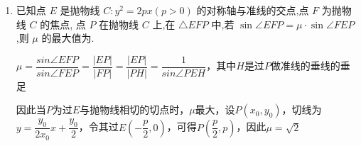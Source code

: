 \begin{enumerate}
\begin{jieda}
        经检验$p = 2, m = 4$满足要求.
    \end{jieda}
    \item 已知点 $E$ 是抛物线 $C : {y}^{2} = {2px}\left( {p > 0}\right)$ 的对称轴与准线的交点,点 $F$ 为抛物线 $C$ 的焦点, 点 $P$ 在抛物线 $C$ 上,在 $\bigtriangleup {EFP}$ 中,若 $\sin \angle {EFP} = \mu  \cdot  \sin \angle {FEP}$ ,则 $\mu$ 的最大值为.
    \begin{jieda}
        $\mu = \dfrac{sin\angle{EFP}}{sin\angle{FEP}} = \dfrac{|EP|}{|FP|} = \dfrac{|EP|}{|PH|} = \dfrac{1}{sin\angle{PEH}}$，其中$H$是过$P$做准线的垂线的垂足

        因此当$P$为过$E$与抛物线相切的切点时，$\mu$最大，设$P(x_0, y_0)$，切线为$y = \dfrac{y_0}{2x_0}x+\dfrac{y_0}{2}$，令其过$E\left(-\dfrac{p}{2}, 0\right)$，可得$P\left(\dfrac{p}{2}, p\right)$，因此$\mu = \sqrt{2}$
    \end{jieda}
\end{enumerate}
